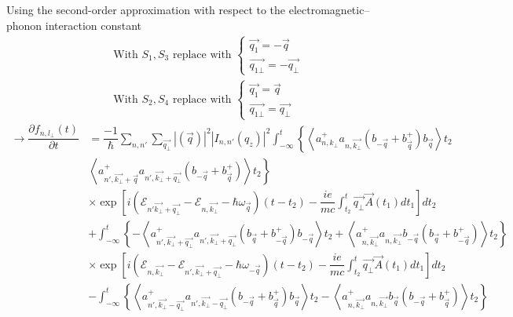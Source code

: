 \documentclass{article}
\begin{document}
\newpage
Using the second-order approximation with respect to the electromagnetic–phonon interaction constant 
\begin{align*}
    & \text{With }S_1, S_3 \text{ replace with } 
    \begin{cases}
        \vec{q_1}= -\vec{q} \\
        \vec{q_{1\bot}} = - \vec{q_\bot} 
    \end{cases} \\
 & \text{With } S_2, S_4 \text{ replace with }
 \begin{cases}
     \vec{q_1} = \vec{q}\\
     \vec{q_{1\bot}} = \vec{q_\bot}
 \end{cases}
\end{align*}
\begin{align*}
    \to \dfrac{\partial f_{n,l_\bot}(t)}{\partial t} & = \dfrac{-1}{\hbar}\sum_{n,n'}\sum_{\vec{q_\bot}} |(\vec{q})|^2 \left| I_{n,n'}(q_z) \right|^2 \int^t_{-\infty} \left\{\left\langle a^+_{n,k_\bot}a_{n,\vec{k_\bot}}\left(b_{-\vec{q}}+ b^+_{\vec{q}}\right)b_{\vec{q}} \right\rangle t_2 \right. \\
    & \left.\left\langle a^+_{n', \vec{k_\bot}+\vec{q}}a_{n',\vec{k_\bot}+\vec{q_\bot}}\left(b_{-\vec{q}}+b^+_{\vec{q}}\right)\right\rangle t_2 \right\} \\
    & \times \exp \left[i \left(\mathcal{E}_{n'\vec{k_\bot}+\vec{q_\bot}}-\mathcal{E}_{n,\vec{k_\bot}} - \hbar\omega_{\vec{q}}\right)(t-t_2) - \dfrac{ie}{mc} \int^t_{t_2} \vec{q_\bot}\vec{A}(t_1)dt_1 \right] dt_2 \\
    & +\int^t_{-\infty}\left\{- \left\langle a^+_{n',\vec{k_\bot}+\vec{q_\bot}}a_{n',\vec{k_\bot}+\vec{q_\bot}}\left(b_{\vec{q}}+b^+_{-\vec{q}} \right)b_{-\vec{q}} \right\rangle t_2+ \left\langle a^+_{n,\vec{k_\bot}}a_{n,\vec{k_\bot}} b_{-\vec{q}}\left(b_{\vec{q}} + b^+_{-\vec{q}} \right) \right\rangle t_2\right\} \\
    & \times \exp \left[i \left(\mathcal{E}_{n,\vec{k_\bot}} - \mathcal{E}_{n',\vec{k_\bot}+\vec{q_\bot}} -\hbar\omega_{-\vec{q}} \right)(t-t_2) -\dfrac{ie}{mc} \int^t_{t_2}\vec{q_\bot}\vec{A}(t_1) dt_1\right] dt_2 \\
    & -\int^t_{-\infty} \left\{\left\langle a^+_{n',\vec{k_\bot}-\vec{q_\bot}}a_{n',\vec{k_\bot}-\vec{q_\bot}}\left(b_{-\vec{q}}+b^+_{\vec{q}} \right)b_{\vec{q}} \right\rangle t_2- \left\langle a^+_{n,\vec{k_\bot}} a_{n,\vec{k_\bot}} b_{\vec{q}} \left(b_{-\vec{q}}+ b^+_{\vec{q}} \right) \right\rangle t_2 \right\}\\

\end{align*}
\end{document}
